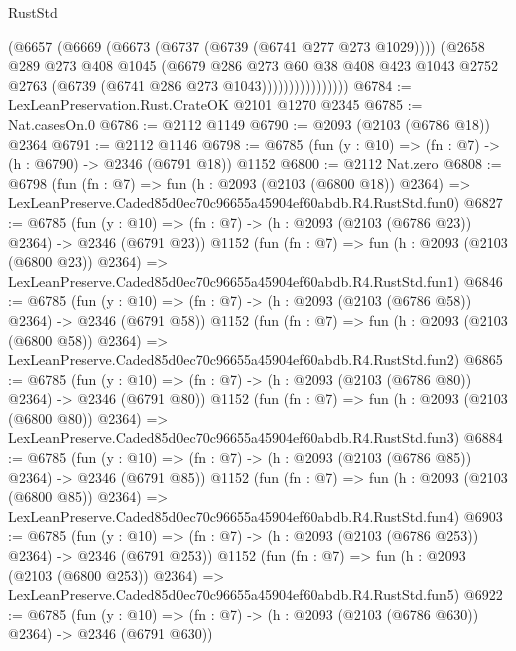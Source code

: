 \begin{lexlean}{RustStd}
\begin{coremodule}
                        (@6657
                          (@6669
                            (@6673 (@6737 (@6739 (@6741 @277 @273 @1029))))
                            (@2658
                              @289
                              @273
                              @408
                              @1045
                              (@6679
                                @286
                                @273
                                @60
                                @38
                                @408
                                @423
                                @1043
                                @2752
                                @2763
                                (@6739 (@6741 @286 @273 @1043))))))))))))))))
@6784 := LexLeanPreservation.Rust.CrateOK @2101 @1270 @2345
@6785 := Nat.casesOn.{0}
@6786 := @2112 @1149
@6790 := @2093 (@2103 (@6786 @18)) @2364
@6791 := @2112 @1146
@6798 := @6785 (fun (y : @10) => (fn : @7) -> (h : @6790) -> @2346 (@6791 @18)) @1152
@6800 := @2112 Nat.zero
@6808 := @6798
    (fun (fn : @7) =>
    fun (h : @2093 (@2103 (@6800 @18)) @2364) =>
    LexLeanPreserve.Caded85d0ec70c96655a45904ef60abdb.R4.RustStd.fun0)
@6827 := @6785
    (fun (y : @10) => (fn : @7) -> (h : @2093 (@2103 (@6786 @23)) @2364) -> @2346 (@6791 @23))
    @1152
    (fun (fn : @7) =>
    fun (h : @2093 (@2103 (@6800 @23)) @2364) =>
    LexLeanPreserve.Caded85d0ec70c96655a45904ef60abdb.R4.RustStd.fun1)
@6846 := @6785
    (fun (y : @10) => (fn : @7) -> (h : @2093 (@2103 (@6786 @58)) @2364) -> @2346 (@6791 @58))
    @1152
    (fun (fn : @7) =>
    fun (h : @2093 (@2103 (@6800 @58)) @2364) =>
    LexLeanPreserve.Caded85d0ec70c96655a45904ef60abdb.R4.RustStd.fun2)
@6865 := @6785
    (fun (y : @10) => (fn : @7) -> (h : @2093 (@2103 (@6786 @80)) @2364) -> @2346 (@6791 @80))
    @1152
    (fun (fn : @7) =>
    fun (h : @2093 (@2103 (@6800 @80)) @2364) =>
    LexLeanPreserve.Caded85d0ec70c96655a45904ef60abdb.R4.RustStd.fun3)
@6884 := @6785
    (fun (y : @10) => (fn : @7) -> (h : @2093 (@2103 (@6786 @85)) @2364) -> @2346 (@6791 @85))
    @1152
    (fun (fn : @7) =>
    fun (h : @2093 (@2103 (@6800 @85)) @2364) =>
    LexLeanPreserve.Caded85d0ec70c96655a45904ef60abdb.R4.RustStd.fun4)
@6903 := @6785
    (fun (y : @10) => (fn : @7) -> (h : @2093 (@2103 (@6786 @253)) @2364) -> @2346 (@6791 @253))
    @1152
    (fun (fn : @7) =>
    fun (h : @2093 (@2103 (@6800 @253)) @2364) =>
    LexLeanPreserve.Caded85d0ec70c96655a45904ef60abdb.R4.RustStd.fun5)
@6922 := @6785
    (fun (y : @10) => (fn : @7) -> (h : @2093 (@2103 (@6786 @630)) @2364) -> @2346 (@6791 @630))

\end{coremodule}
\end{lexlean}
